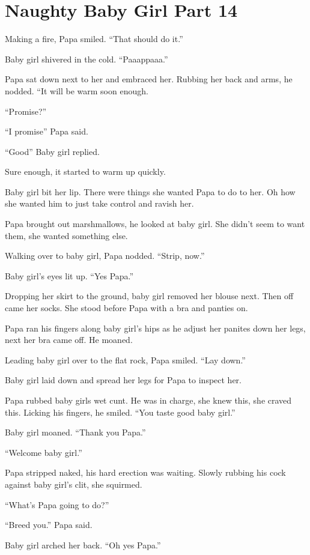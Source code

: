 \section{Naughty Baby Girl Part 14}

    Making a fire, Papa smiled. “That should do it.”

    Baby girl shivered in the cold. “Paaappaaa.”

    Papa sat down next to her and embraced her. Rubbing her back and arms, he nodded. “It will be warm soon enough.

    “Promise?”

    “I promise” Papa said.

    “Good” Baby girl replied.

    Sure enough, it started to warm up quickly.

    Baby girl bit her lip. There were things she wanted Papa to do to her. Oh how she wanted him to just take control and ravish her.

    Papa brought out marshmallows, he looked at baby girl. She didn’t seem to want them, she wanted something else.

    Walking over to baby girl, Papa nodded. “Strip, now.”

    Baby girl’s eyes lit up. “Yes Papa.”

    Dropping her skirt to the ground, baby girl removed her blouse next. Then off came her socks. She stood before Papa with a bra and panties on.

    Papa ran his fingers along baby girl’s hips as he adjust her panites down her legs, next her bra came off. He moaned.

    Leading baby girl over to the flat rock, Papa smiled. “Lay down.”

    Baby girl laid down and spread her legs for Papa to inspect her.

    Papa rubbed baby girls wet cunt. He was in charge, she knew this, she craved this. Licking his fingers, he smiled. “You taste good baby girl.”

    Baby girl moaned. “Thank you Papa.”

    “Welcome baby girl.”

    Papa stripped naked, his hard erection was waiting. Slowly rubbing his cock against baby girl’s clit, she squirmed.

    “What’s Papa going to do?”

    “Breed you.” Papa said.

    Baby girl arched her back. “Oh yes Papa.”

